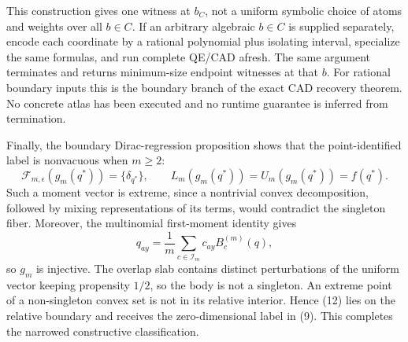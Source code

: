 This construction gives one witness at \(b_C\), not a uniform symbolic choice of atoms and weights over all \(b\in C\).  If an arbitrary algebraic \(b\in C\) is supplied separately, encode each coordinate by a rational polynomial plus isolating interval, specialize the same formulas, and run complete QE/CAD afresh.  The same argument terminates and returns minimum-size endpoint witnesses at that \(b\).  For rational boundary inputs this is the boundary branch of the exact CAD recovery theorem.  No concrete atlas has been executed and no runtime guarantee is inferred from termination.

Finally, the boundary Dirac-regression proposition shows that the point-identified label is nonvacuous when \(m\geq2\):
\[
 \mathcal F_{m,\epsilon}(g_m(q^*))=\{\delta_{q^*}\},
 \qquad L_m(g_m(q^*))=U_m(g_m(q^*))=f(q^*).
\tag{12}
\]
Such a moment vector is extreme, since a nontrivial convex decomposition, followed by mixing representations of its terms, would contradict the singleton fiber.  Moreover, the multinomial first-moment identity gives
\[
 q_{ay}=\frac1m\sum_{c\in\mathcal I_m}c_{ay}B_c^{(m)}(q),
\tag{13}
\]
so \(g_m\) is injective.  The overlap slab contains distinct perturbations of the uniform vector keeping propensity \(1/2\), so the body is not a singleton.  An extreme point of a non-singleton convex set is not in its relative interior.  Hence (12) lies on the relative boundary and receives the zero-dimensional label in (9).  This completes the narrowed constructive classification.